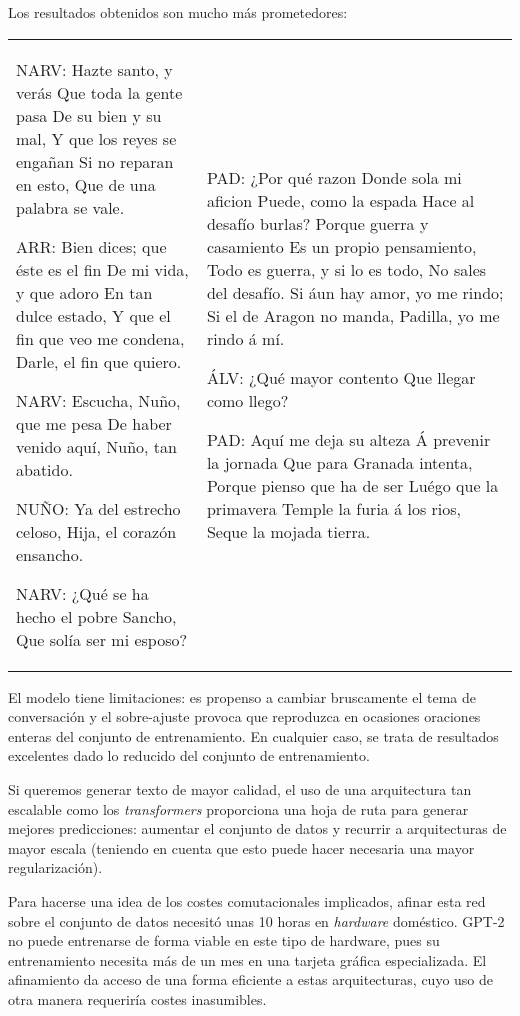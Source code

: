 Los resultados obtenidos son mucho más prometedores:
\noindent
\begin{table}[H]
  \centering
  \begin{tabular}{ ll }
  \begin{Code}
    NARV:
    Hazte santo, y verás
    Que toda la gente pasa
    De su bien y su mal,
    Y que los reyes se engañan
    Si no reparan en esto,
    Que de una palabra se vale.
    
    ARR:
    Bien dices; que éste es el fin
    De mi vida, y que adoro
    En tan dulce estado,
    Y que el fin que veo me condena,
    Darle, el fin que quiero.    

    NARV:
    Escucha, Nuño, que me pesa
    De haber venido aquí,
    Nuño, tan abatido.

    NUÑO:
    Ya del estrecho celoso,
    Hija, el corazón ensancho.

    NARV:
    ¿Qué se ha hecho el pobre Sancho,
    Que solía ser mi esposo?
  \end{Code} 
  &
  \begin{Code}
    PAD:
    ¿Por qué razon
    Donde sola mi aficion
    Puede, como la espada
    Hace al desafío burlas?
    Porque guerra y casamiento
    Es un propio pensamiento,
    Todo es guerra, y si lo es todo,
    No sales del desafío.
    Si áun hay amor, yo me rindo;
    Si el de Aragon no manda,
    Padilla, yo me rindo á mí.
    
    ÁLV:
    ¿Qué mayor contento
    Que llegar como llego?
    
    PAD:
    Aquí me deja su alteza
    Á prevenir la jornada
    Que para Granada intenta,
    Porque pienso que ha de ser
    Luégo que la primavera
    Temple la furia á los rios,
    Seque la mojada tierra.  
  \end{Code}
\end{tabular}
\end{table}

El modelo tiene limitaciones: es propenso a cambiar bruscamente el tema de conversación y el sobre-ajuste provoca que reproduzca en ocasiones oraciones enteras del conjunto de entrenamiento. En cualquier caso, se trata de resultados excelentes dado lo reducido del conjunto de entrenamiento.

Si queremos generar texto de mayor calidad, el uso de una arquitectura tan escalable como los \textit{transformers} proporciona una hoja de ruta para generar mejores predicciones: aumentar el conjunto de datos y recurrir a arquitecturas de mayor escala (teniendo en cuenta que esto puede hacer necesaria una mayor regularización).

Para hacerse una idea de los costes comutacionales implicados, afinar esta red sobre el conjunto de datos necesitó unas 10 horas en \textit{hardware} doméstico. GPT-2 no puede entrenarse de forma viable en este tipo de hardware, pues su entrenamiento necesita más de un mes en una tarjeta gráfica especializada. El afinamiento da acceso de una forma eficiente a estas arquitecturas, cuyo uso de otra manera requeriría costes inasumibles.